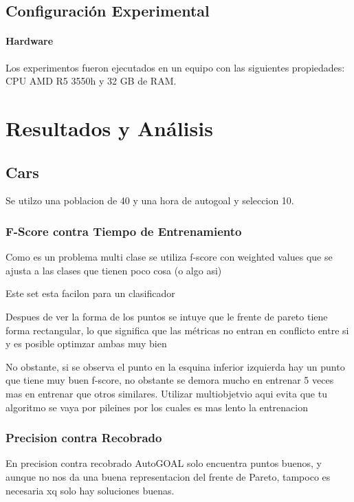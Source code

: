 \subsection{Configuraci\'on Experimental}

\paragraph{Hardware} Los experimentos fueron ejecutados en un equipo con las siguientes propiedades: CPU AMD R5 3550h y 32 GB de RAM.

\section{Resultados y An\'alisis}

\subsection{Cars}

Se utilzo una poblacion de 40 y una hora de autogoal y seleccion 10.

\subsubsection{F-Score contra Tiempo de Entrenamiento}

Como es un problema multi clase se utiliza f-score con weighted values que se ajusta a las clases que tienen poco cosa (o algo asi)

Este set esta facilon para un clasificador 

Despues de ver la forma de los puntos se intuye que le frente de pareto tiene forma rectangular, lo que significa que las m\'etricas no entran en conflicto entre si y es posible optimzar ambas muy bien

No obstante, si se observa el punto en la esquina inferior izquierda hay un punto que tiene muy buen f-score, no obstante se demora mucho en entrenar 5 veces mas en entrenar que otros similares. Utilizar multiobjetvio aqui evita que tu algoritmo se vaya  por pileines por los cuales es mas lento la entrenacion

\subsubsection{Precision contra Recobrado}

En precision contra recobrado AutoGOAL solo encuentra puntos buenos, y aunque no nos da una buena representacion del frente de Pareto, tampoco es necesaria xq solo hay soluciones buenas.

